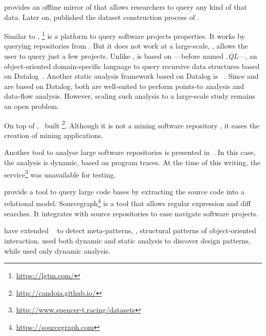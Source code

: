 \cite{gousiosGHTorentDatasetTool2013} provides an offline mirror of \github{} that allows researchers to query any kind of that data.
Later on, \cite{gousiosLeanGHTorrentGitHub2014} published the dataset construction process of \github{}.

Similar to \boa{}, \lgtm{}\footnote{\url{https://lgtm.com/}} is a platform to query software projects properties.
It works by querying repositories from \github{}.
But it does not work at a large-scale, \ie{}, \lgtm{} allows the user to query just a few projects.
Unlike \boa{}, \lgtm{} is based on \ql{}---before named \emph{.QL}---,
an object-oriented domain-specific language to query recursive data structures based on Datalog~\citep{avgustinovQLObjectorientedQueries2016}.
Another static analysis framework based on Datalog is \doop{}~\citep{bravenboerStrictlyDeclarativeSpecification}.
Since \ql{} and \doop{} are based on Datalog,
both are well-suited to perform points-to analysis and data-flow analysis.
However, scaling such analysis to a large-scale study remains an open problem.

On top of \boa{},~\cite{tiwariCandoiaPlatformBuilding2017} built \candoia{}%
\footnote{\url{http://candoia.github.io/}}.
Although it is not a mining software repository \perse{},
it eases the creation of mining applications. 

Another tool to analyse large software repositories is presented in~\cite{brandauerSpencerInteractiveHeap2017}.
In this case, the analysis is dynamic, based on program traces. 
At the time of this writing, the service\footnote{\url{http://www.spencer-t.racing/datasets}} was unavailable for testing. 

\cite{bajracharyaSourcererInternetscaleSoftware2009} provide a tool to query large code bases by extracting the source code into a relational model.
Sourcegraph\footnote{\url{https://sourcegraph.com}} is a tool that allows regular expression and diff searches.
It integrates with source repositories to ease navigate software projects.

\cite{posnettTHEXMiningMetapatterns2010} have extended
\asm{}~\citep{brunetonASMCodeManipulation2002}
to detect meta-patterns, \ie{},
structural patterns of object-oriented interaction.
\cite{huDynamicAnalysisDesign2008} used both dynamic and static analysis to discover design patterns, while \cite{arcelliDesignPatternDetection2008} used only dynamic analysis.


